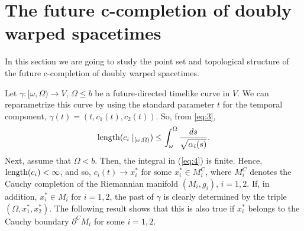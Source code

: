 \section{The future c-completion of doubly warped spacetimes}
\label{sec:futurecompletion}
 In this section we are going to study the point set and topological structure of the future c-completion of doubly warped spacetimes.

 Let $\gamma: [\omega,\Omega) \rightarrow V$, $\Omega\leq b$ be a future-directed timelike
curve in $V$. We can reparametrize this curve by using the standard parameter $t$ for the temporal component,
$\gamma(t)=(t,c_{1}(t),c_{2}(t))$. So, from \eqref{eq:3},
\begin{equation}
  \label{eq:4}
  \hbox{length}(c_{i}\mid_{[\omega,\Omega)})
  \leq\int_{\omega}^{\Omega}\frac{ds}{\sqrt{\alpha_{i}(s)}}.
\end{equation}
Next, assume that
$\Omega<b$. Then, the integral in (\ref{eq:4}) is finite. Hence, $\hbox{length}(c_i)<\infty$, and so, $c_{i}(t)\rightarrow x_i^*$ for some $x_i^*\in M_i^C$, where $M_i^C$ denotes the Cauchy completion of the Riemannian manifold $(M_i,g_i)$, $i=1,2$. If, in addition, $x_i^*\in M_i$ for $i=1,2$, the past of $\gamma$ is clearly determined by the triple $(\Omega,x_1^*,x_2^*)$. The following result shows that this is also true if $x_i^*$ belongs to the Cauchy boundary $\partial^C M_i$ for some $i=1,2$.

